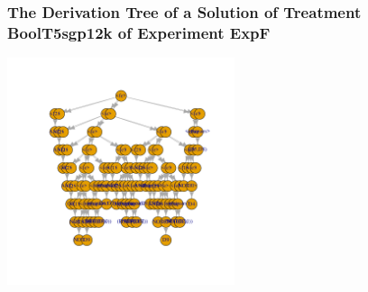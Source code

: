  \begin{frame}
 \frametitle{ The Derivation Tree of a Solution of Treatment BoolT5sgp12k of Experiment ExpF }
 \begin{center}
\includegraphics[width=0.5\textwidth, angle=0]
{ExpFDerivationTreeFigure002.pdf}
 \end{center}
 \label{report/ExpFDerivationTreeFigure002.pdf}  
 \end{frame}

